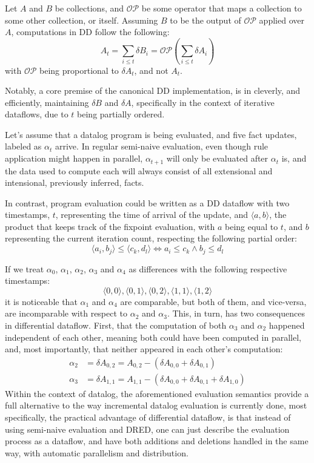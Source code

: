 \documentclass[sigconf,screen,review=false,natbib]{acmart}
\theoremstyle{definition}
\begin{document}
Let $A$ and $B$ be collections, and $\mathcal{OP}$ be some operator that maps a collection to some other
collection, or itself. Assuming $B$ to be the output of $\mathcal{OP}$ applied over $A$, computations in
DD follow the following: \[A_t = \sum_{i \leq t} \delta B_i = \mathcal{OP}(\sum_{i \leq t} \delta A_i)\]
with $\mathcal{OP}$ being proportional to $\delta A_t$, and not $A_t$.

Notably, a core premise of the canonical DD implementation, is in cleverly, and efficiently,
maintaining $\delta B$ and $\delta A$, specifically in the context of iterative dataflows, due to $t$ being
partially ordered.

Let's assume that a datalog program is being evaluated, and five fact updates, labeled as $\alpha_t$ arrive. In
regular semi-naive evaluation, even though rule application might happen in parallel, $\alpha_{t + 1}$ will only be
evaluated after $\alpha_{t}$ is, and the data used to compute each will always consist of all extensional and
intensional, previously inferred, facts.

In contrast, program evaluation could be written as a DD dataflow with two timestamps, $t$,
representing the time of arrival of the update, and $\langle a, b \rangle$, the product that keeps track of the
fixpoint evaluation, with $a$ being equal to $t$, and $b$ representing the current iteration count, respecting
the following partial order: \[\langle a_i, b_j \rangle \leq \langle c_k, d_l \rangle \iff a_i \leq c_k \wedge b_j \leq d_l\]

If we treat $\alpha_0$, $\alpha_1$, $\alpha_2$, $\alpha_3$ and $\alpha_4$ as differences with the following
respective timestamps: \[\langle 0, 0 \rangle, \langle 0, 1 \rangle, \langle 0, 2 \rangle, \langle 1, 1 \rangle, \langle 1, 2 \rangle\]
it is noticeable that $\alpha_1$ and $\alpha_4$ are comparable, but both of them, and vice-versa, are
incomparable with respect to $\alpha_2$ and $\alpha_3$. This, in turn, has two consequences in differential
dataflow. First, that the computation of both $\alpha_3$ and $\alpha_2$ happened independent of each other,
meaning both could have been computed in parallel, and, most importantly, that neither appeared in each other's
computation:
\begin{align*}
	\alpha_2 & = \delta A_{0, 2} = A_{0, 2} - (\delta A_{0, 0} + \delta A_{0, 1} )                  \\
	\alpha_3 & = \delta A_{1, 1} = A_{1, 1} - (\delta A_{0, 0} + \delta A_{0, 1} + \delta A_{1, 0})
\end{align*}
Within the context of datalog, the aforementioned evaluation semantics provide a full alternative to the way
incremental datalog evaluation is currently done, most specifically, the practical advantage of differential
dataflow, is that instead of using semi-naive evaluation and DRED, one can just describe the evaluation process
as a dataflow, and have both additions and deletions handled in the same way, with automatic parallelism and
distribution.
\end{document}
